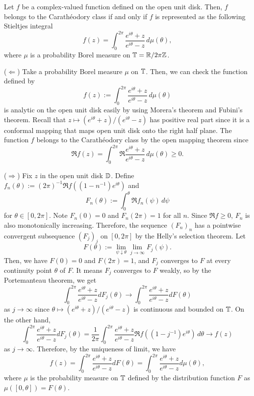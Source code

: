 \documentclass[12pt]{article}
\begin{document}
\begin{thm}
Let $f$ be a complex-valued function defined on the open unit disk.
Then, $f$ belongs to the Carath\'eodory class if and only if $f$ is represented as the following Stieltjes integral
\[f(z)=\int_0^{2\pi}\frac{e^{i\theta}+z}{e^{i\theta}-z}\,d\mu(\theta),\]
where $\mu$ is a probability Borel measure on $\mathbb{T}=\mathbb{R}/2\pi\mathbb{Z}$.
\end{thm}
\begin{pf}
($\Leftarrow$)
Take a probability Borel measure $\mu$ on $\mathbb{T}$.
Then, we can check the function defined by
\[f(z):=\int_0^{2\pi}\frac{e^{i\theta}+z}{e^{i\theta}-z}\,d\mu(\theta)\]
is analytic on the open unit disk easily by using Morera's theorem and Fubini's theorem.
Recall that $z\mapsto(e^{i\theta}+z)/(e^{i\theta}-z)$ has positive real part since it is a conformal mapping that maps open unit disk onto the right half plane.
The function $f$ belongs to the Carath\'eodory class by the open mapping theorem since
\[\Re f(z)=\int_0^{2\pi}\Re\frac{e^{i\theta}+z}{e^{i\theta}-z}\,d\mu(\theta)\ge0.\]

($\Rightarrow$)
Fix $z$ in the open unit disk $\mathbb{D}$.
Define $f_n(\theta):=(2\pi)^{-1}\Re f((1-n^{-1})e^{i\theta})$ and
\[F_n(\theta):=\int_0^\theta\Re f_n(\psi)\,d\psi\]
for $\theta\in[0,2\pi]$.
Note $F_n(0)=0$ and $F_n(2\pi)=1$ for all $n$.
Since $\Re f\ge0$, $F_n$ is also monotonically increasing.
Therefore, the sequence $(F_n)_n$ has a pointwise convergent subsequence $(F_j)_j$ on $[0,2\pi]$ by the Helly's selection theorem.
Let
\[F(\theta):=\lim_{\psi\downarrow\theta}\lim_{j\to\infty}F_j(\psi).\]
Then, we have $F(0)=0$ and $F(2\pi)=1$, and $F_j$ converges to $F$ at every continuity point $\theta$ of $F$.
It means $F_j$ converges to $F$ weakly, so by the Portemanteau theorem, we get
\[\int_0^{2\pi}\frac{e^{i\theta}+z}{e^{i\theta}-z}dF_j(\theta)\to\int_0^{2\pi}\frac{e^{i\theta}+z}{e^{i\theta}-z}dF(\theta)\]
as $j\to\infty$ since $\theta\mapsto(e^{i\theta}+z)/(e^{i\theta}-z)$ is continuous and bounded on $\mathbb{T}$.
On the other hand,
\[\int_0^{2\pi}\frac{e^{i\theta}+z}{e^{i\theta}-z}dF_j(\theta)
=\frac1{2\pi}\int_0^{2\pi}\frac{e^{i\theta}+z}{e^{i\theta}-z}\Re f((1-j^{-1})e^{i\theta})\,d\theta\to f(z)\]
as $j\to\infty$.
Therefore, by the uniqueness of limit, we have
\[f(z)=\int_0^{2\pi}\frac{e^{i\theta}+z}{e^{i\theta}-z}dF(\theta)=\int_0^{2\pi}\frac{e^{i\theta}+z}{e^{i\theta}-z}d\mu(\theta),\]
where $\mu$ is the probability measure on $\mathbb{T}$ defined by the distribution function $F$ as $\mu([0,\theta])=F(\theta)$.
\end{pf}
\end{document}
